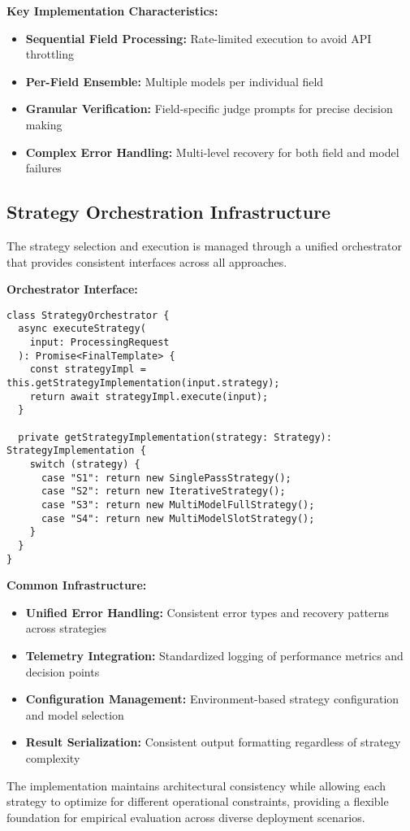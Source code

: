 \textbf{Key Implementation Characteristics:}
\begin{itemize}
    \item \textbf{Sequential Field Processing:} Rate-limited execution to avoid API throttling
    \item \textbf{Per-Field Ensemble:} Multiple models per individual field
    \item \textbf{Granular Verification:} Field-specific judge prompts for precise decision making
    \item \textbf{Complex Error Handling:} Multi-level recovery for both field and model failures
\end{itemize}

\subsection{Strategy Orchestration Infrastructure}
\label{subsec:impl-orchestration}

The strategy selection and execution is managed through a unified orchestrator that provides consistent interfaces across all approaches.

\textbf{Orchestrator Interface:}
\begin{verbatim}
class StrategyOrchestrator {
  async executeStrategy(
    input: ProcessingRequest
  ): Promise<FinalTemplate> {
    const strategyImpl = this.getStrategyImplementation(input.strategy);
    return await strategyImpl.execute(input);
  }
  
  private getStrategyImplementation(strategy: Strategy): StrategyImplementation {
    switch (strategy) {
      case "S1": return new SinglePassStrategy();
      case "S2": return new IterativeStrategy(); 
      case "S3": return new MultiModelFullStrategy();
      case "S4": return new MultiModelSlotStrategy();
    }
  }
}
\end{verbatim}

\textbf{Common Infrastructure:}
\begin{itemize}
    \item \textbf{Unified Error Handling:} Consistent error types and recovery patterns across strategies
    \item \textbf{Telemetry Integration:} Standardized logging of performance metrics and decision points
    \item \textbf{Configuration Management:} Environment-based strategy configuration and model selection
    \item \textbf{Result Serialization:} Consistent output formatting regardless of strategy complexity
\end{itemize}

The implementation maintains architectural consistency while allowing each strategy to optimize for different operational constraints, providing a flexible foundation for empirical evaluation across diverse deployment scenarios.